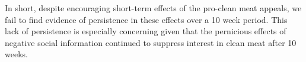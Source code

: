 \documentclass[12pt]{article}
\newcommand{\figurepath}[1]{../output/figures/#1}
\begin{document}
In short, despite encouraging short-term effects of the pro-clean meat appeals, we fail to find evidence of persistence in these effects over a 10 week period. This lack of persistence is especially concerning given that the pernicious effects of negative social information continued to suppress interest in clean meat after 10 weeks.






\end{document}

